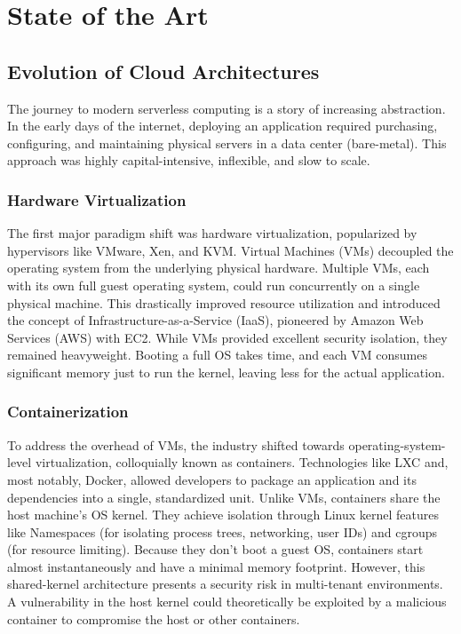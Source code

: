 \documentclass[12pt,a4paper]{report}
\begin{document}
\vspace{5cm} \lipsum[1-20]

\clearpage{}
\clearpage{}\chapter{State of the Art}

\section{Evolution of Cloud Architectures}
The journey to modern serverless computing is a story of increasing abstraction. In the early days of the internet, deploying an application required purchasing, configuring, and maintaining physical servers in a data center (bare-metal). This approach was highly capital-intensive, inflexible, and slow to scale.

\subsection{Hardware Virtualization}
The first major paradigm shift was hardware virtualization, popularized by hypervisors like VMware, Xen, and KVM. Virtual Machines (VMs) decoupled the operating system from the underlying physical hardware. Multiple VMs, each with its own full guest operating system, could run concurrently on a single physical machine. This drastically improved resource utilization and introduced the concept of Infrastructure-as-a-Service (IaaS), pioneered by Amazon Web Services (AWS) with EC2. While VMs provided excellent security isolation, they remained heavyweight. Booting a full OS takes time, and each VM consumes significant memory just to run the kernel, leaving less for the actual application.

\subsection{Containerization}
To address the overhead of VMs, the industry shifted towards operating-system-level virtualization, colloquially known as containers. Technologies like LXC and, most notably, Docker, allowed developers to package an application and its dependencies into a single, standardized unit. Unlike VMs, containers share the host machine's OS kernel. They achieve isolation through Linux kernel features like Namespaces (for isolating process trees, networking, user IDs) and cgroups (for resource limiting).
Because they don't boot a guest OS, containers start almost instantaneously and have a minimal memory footprint. However, this shared-kernel architecture presents a security risk in multi-tenant environments. A vulnerability in the host kernel could theoretically be exploited by a malicious container to compromise the host or other containers.
\end{document}
